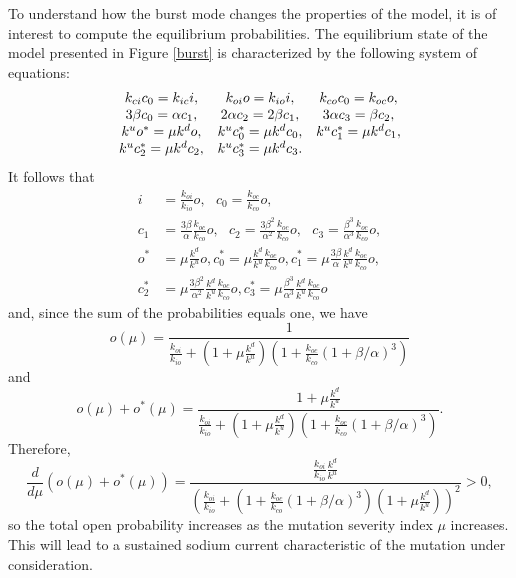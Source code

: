 To understand how the burst mode changes the properties of the model,
it is of interest to compute the equilibrium probabilities. 
The equilibrium state of the model presented in Figure \ref{burst} is
characterized by the following system of equations:%
\begin{equation}%
\begin{array}
[c]{ccc}%
k_{ci}c_{0}=k_{ic}i, & k_{oi}o=k_{io}i, & k_{co}c_{0}=k_{oc}o,\\
3\beta c_{0}=\alpha c_{1}, & 2\alpha c_{2}=2\beta c_{1}, & 3\alpha c_{3}=\beta c_{2},\\
k^{u}o^{\ast}=\mu k^{d}o, & k^{u}c_{0}^{\ast}=\mu k^{d}c_{0}, & k^{u}%
c_{1}^{\ast}=\mu k^{d}c_{1},\\
k^{u}c_{2}^{\ast}=\mu k^{d}c_{2}, & k^{u}c_{3}^{\ast}=\mu k^{d}c_{3}. &
\end{array}
\label{ep1}
\end{equation}
It follows that%
\begin{align*}
i &  =\frac{k_{oi}}{k_{io}}o,\text{ }c_{0}=\frac{k_{oc}}{k_{co}}o,\text{ }\\
c_{1} &  =\frac{3\beta}{\alpha}\frac{k_{oc}}{k_{co}}o,\text{ }c_{2}%
=\frac{3\beta^{2}}{\alpha^{2}}\frac{k_{oc}}{k_{co}}o,\text{ }c_{3}=\frac
{\beta^{3}}{\alpha^{3}}\frac{k_{oc}}{k_{co}}o,\\
o^{\ast} &  =\mu\frac{k^{d}}{k^{u}}o,c_{0}^{\ast}=\mu\frac{k^{d}}{k^{u}}%
\frac{k_{oc}}{k_{co}}o,c_{1}^{\ast}=\mu\frac{3\beta}{\alpha}\frac{k^{d}}%
{k^{u}}\frac{k_{oc}}{k_{co}}o,\\
c_{2}^{\ast} &  =\mu\frac{3\beta^{2}}{\alpha^{2}}\frac{k^{d}}{k^{u}}%
\frac{k_{oc}}{k_{co}}o,c_{3}^{\ast}=\mu\frac{\beta^{3}}{\alpha^{3}}\frac
{k^{d}}{k^{u}}\frac{k_{oc}}{k_{co}}o
\end{align*}
and, since the sum of the probabilities equals one, we have%
\[
o\left(  \mu\right)  =\frac{1}{\frac{k_{oi}}{k_{io}}+\left(  1+\mu\frac{k^{d}%
}{k^{u}}\right)  \left(  1+\frac{k_{oc}}{k_{co}}\left(  1+\beta/\alpha\right)
^{3}\right)  }
\]
and
\[
o\left(  \mu\right)  +o^{\ast}\left(  \mu\right)  =\frac{1+\mu\frac{k^{d}%
}{k^{u}}}{\frac{k_{oi}}{k_{io}}+\left(  1+\mu\frac{k^{d}}{k^{u}}\right)
\left(  1+\frac{k_{oc}}{k_{co}}\left(  1+\beta/\alpha\right)  ^{3}\right)  }.%
\]
Therefore,
\[
\frac{d}{d\mu}\left(  o\left(  \mu\right)  +o^{\ast}\left(  \mu\right)
\right)  =\frac{\frac{k_{oi}}{k_{io}}\frac{k^{d}}{k^{u}}}{\left(  \frac
{k_{oi}}{k_{io}}+\left(  1+\frac{k_{oc}}{k_{co}}\left(  1+\beta/\alpha\right)
^{3}\right)  \left(  1+\mu\frac{k^{d}}{k^{u}}\right)  \right)  ^{2}}>0,%
\]
so the total open probability increases as the mutation severity index
$\mu$ increases. This will lead to a sustained sodium current characteristic
of the mutation under consideration. 

